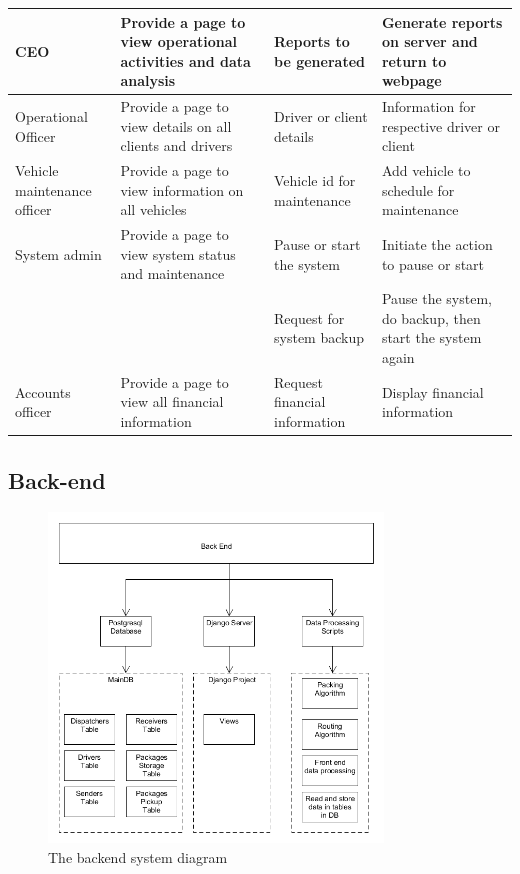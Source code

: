 \documentclass[paper=a4, fontsize=11pt]{scrartcl} %
\numberwithin{equation}{section} %
\numberwithin{figure}{section} %
\numberwithin{table}{section} %
\begin{document}
\begin{table}[]
\begin{tabular}{|p{2cm}|p{4cm}|p{4cm}|p{4cm}|}
CEO                         & Provide a page to view operational activities and data analysis                                     & Reports to be generated            & Generate reports on server and return to webpage         \\ \hline
Operational Officer         & Provide a page to view details on all clients and drivers                                           & Driver or client details           & Information for respective driver or client              \\ \hline
Vehicle maintenance officer & Provide a page to view information on all vehicles                                                  & Vehicle id for maintenance         & Add vehicle to schedule for maintenance                  \\ \hline
System admin                & Provide a page to view system status and maintenance                                                & Pause or start the system          & Initiate the action to pause or start                    \\ \hline
                            &                                                                                                     & Request for system backup          & Pause the system, do backup, then start the system again \\ \hline
Accounts officer            & Provide a page to view all financial information                                                    & Request financial information      & Display financial information                            \\ \hline
\end{tabular}
\end{table}

\subsection{Back-end}
\begin{figure}[hbt!]
\centering
\includegraphics[width=3.5in]{pictures/backend.png}
\caption{The backend system diagram}
\label{Backend}
\end{figure}
\end{document}
